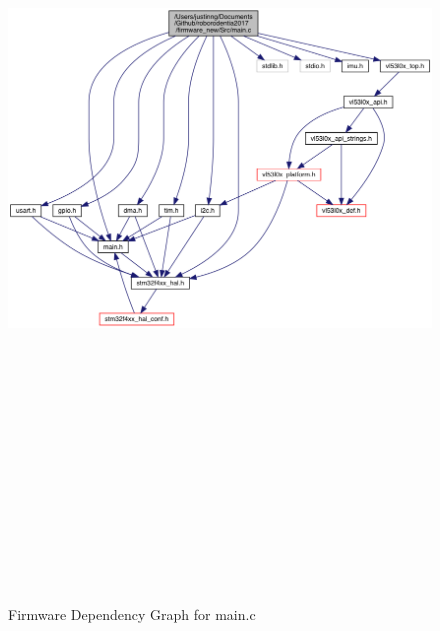 \begin{figure}[H]   %
	\centering \includegraphics[width=6in,height=9in,keepaspectratio]{figures/firmware_dependencies.png}
	\caption{Firmware Dependency Graph for main.c}\label{fig:firmware_dependencies}
\end{figure}


